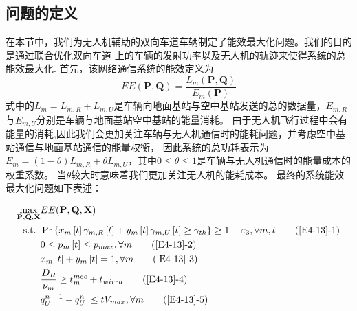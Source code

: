 \subsection{问题的定义}\label{section4-2-3}
在本节中，我们为无人机辅助的双向车道车辆制定了能效最大化问题。我们的目的是通过联合优化双向车道
上的车辆的发射功率以及无人机的轨迹来使得系统的总能效最大化.
首先，该网络通信系统的能效定义为
\begin{equation} \label{E4-12}
EE(\mathbf{P}, \mathbf{Q})=
{\frac{{{L}_{m}}\left( \mathbf{P}, \mathbf{Q} \right)}
{{{E}_{m}}\left( \mathbf{P} \right)}}
\end{equation}
式中的${{L}_{m}={L}_{m,R}+{L}_{m,U}}$是车辆向地面基站与空中基站发送的总的数据量，${E}_{m,R}$与${E}_{m,U}$分别是车辆与地面基站空中基站的能量消耗。
由于无人机飞行过程中会有能量的消耗,因此我们会更加关注车辆与无人机通信时的能耗问题，并考虑空中基站通信与地面基站通信的能量权衡，
因此系统的总功耗表示为${{E}_{m}=(1-\theta){L}_{m,R}+\theta{L}_{m,U}}$，其中$0\le \theta \le 1$是车辆与无人机通信时的能量成本的权重系数。
当$\theta$较大时意味着我们更加关注无人机的能耗成本。
最终的系统能效最大化问题如下表述：

\begin{align}
\max _{ \mathbf{P}, \mathbf{Q}, \mathbf{X} }  & EE(\mathbf{P}, \mathbf{Q}, \mathbf{X})                \label{E4-13}\\
\text { s.t. }
& \Pr\left\{x_m\left[t\right]\gamma_{m,R}\left[t\right]+
y_m\left[t\right]\gamma_{m,U}\left[t\right]\geq \gamma_{th}\right\}\geq1-
\varepsilon_3, \forall m,t                                               \tag{\ref{E4-13}{-1}}      \label{E4-13-1}\\  %
& 0\le p_m\left[t\right]\le p_{max}, \forall m                           \tag{\ref{E4-13}{-2}}      \label{E4-13-2}\\  %
& x_m\left[t\right] + y_m\left[t\right]=1, \forall m                     \tag{\ref{E4-13}{-3}}      \label{E4-13-3}\\  %
& \frac{D_R}{\nu_m} \geq t_{m}^{mec}+t_{wired}                           \tag{\ref{E4-13}{-4}}      \label{E4-13-4}\\  %
& q_U^{n\mathrm{\ }+1}-q_U^{n\mathrm{\ }}\le tV_{max}, \forall m         \tag{\ref{E4-13}{-5}}      \label{E4-13-5}    %
\end{align}

